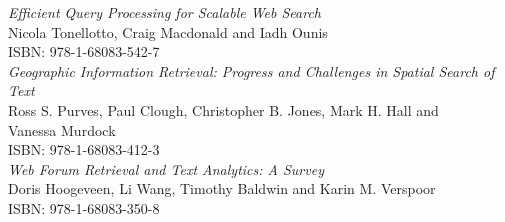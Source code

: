 \vspace{12pt}
\noindent \textit{Efficient Query Processing for Scalable Web Search}\\
Nicola Tonellotto, Craig Macdonald and Iadh Ounis\\
ISBN: 978-1-68083-542-7\\

\noindent \textit{Geographic Information Retrieval: Progress and Challenges in Spatial Search of Text}\\
Ross S. Purves, Paul Clough, Christopher B. Jones, Mark H. Hall and\\ Vanessa Murdock\\
ISBN: 978-1-68083-412-3\\

\noindent \textit{Web Forum Retrieval and Text Analytics: A Survey}\\
Doris Hoogeveen, Li Wang, Timothy Baldwin and Karin M. Verspoor\\
ISBN: 978-1-68083-350-8